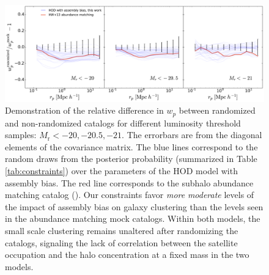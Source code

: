 \documentclass[12pt, preprint]{aastex}
\begin{document}
\begin{figure}[p]~\\
\begin{center}
\includegraphics[width=\textwidth]{paper_wprandom.pdf}
 \caption{Demonstration of the relative difference in $w_{p}$ between randomized and non-randomized catalogs for different luminosity threshold samples: $M_{\mathrm r}<-20,-20.5,-21$. The errorbars are from the diagonal elements of the covariance matrix. The blue lines correspond to the random draws from the posterior probability (summarized in Table \ref{tab:constraints}) over the parameters of the HOD model with assembly bias. The red line corresponds to the subhalo abundance matching catalog (\citealt{hw2013,hearin2014}). Our constraints favor \emph{more} \emph{moderate} levels of the impact of assembly bias on galaxy clustering than the levels seen in the abundance matching mock catalogs. Within both models, the small scale clustering remains unaltered after randomizing the catalogs, signaling the lack of correlation between the satellite occupation and the halo concentration at a fixed mass in the two models.}
\label{fig:randomized}
\end{center}
\end{figure}

\clearpage
\end{document}
